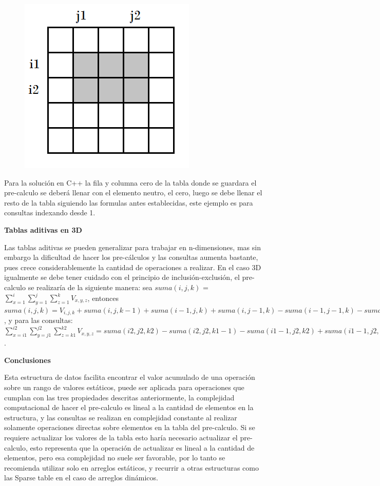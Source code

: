 \documentclass[12pt, a4paper]{article}
\newcommand\cppfile[2][]{

}
\newcommand{\subtitulo}[1]{\begin{center}\textbf{#1}\end{center}}
\begin{document}
\begin{figure}[!htb]
			\caption{}%
		\endminipage
			\centering
			\includegraphics[scale=0.4]{Estructuras_de_datos/imagenes/img4}
			\caption{}
		\endminipage
	\end{figure}
	
	Para la solución en C++ la fila y columna cero de la tabla donde se guardara el pre-calculo se deberá llenar
	con el elemento neutro, el cero, luego se debe llenar el resto de la tabla siguiendo las formulas antes 
	establecidas, este ejemplo es para consultas indexando desde 1.
	\cppfile[26-36]{Estructuras_de_datos/codigos/tablas_aditivas.cpp}
	
	\subtitulo{Tablas aditivas en 3D}
	
	Las tablas aditivas se pueden generalizar para trabajar en n-dimensiones, mas sin embargo la dificultad de hacer 
	los pre-cálculos y las consultas aumenta bastante, pues crece considerablemente la cantidad de operaciones a
	realizar. En el caso 3D igualmente se debe tener cuidado con el principio de inclusión-exclusión, el 
	pre-calculo se realizaría de la siguiente manera: sea 
	$suma(i,j,k)$ = $\sum_{x=1}^{i} \sum_{y=1}^{j} \sum_{z=1}^{k} V_{x,y,z}$, entonces  
	$suma(i,j,k) = V_{i,j,k} + suma(i,j,k-1)+suma(i-1,j,k)+suma(i,j-1,k)-suma(i-1,j-1,k)-suma(i-1,j,k-1)
	-suma(i,j-1,k-1)+suma(i-1,j-1,k-1)$, y para las consultas: $\sum_{x=i1}^{i2} \sum_{y=j1}^{j2} \sum_{z=k1}^{k2}
	V_{x,y,z} = suma(i2,j2,k2)-suma(i2,j2,k1-1)-suma(i1-1,j2,k2)+suma(i1-1,j2,k1-1)-suma(i2,j1-1,k2)
	+suma(i2,j1-1,k1-1)+suma(i1-1,j1-1,k2)-suma(i1-1,j1-1,k1-1)$.
	
	\subtitulo{Conclusiones}
	Esta estructura de datos facilita encontrar el valor acumulado de una operación sobre un rango de valores 
	estáticos, puede ser aplicada para operaciones que cumplan con las tres propiedades descritas
	anteriormente, la complejidad computacional de hacer el pre-calculo es lineal a la cantidad de
	elementos en la estructura, y las consultas se realizan en complejidad constante al realizar solamente operaciones
	directas sobre elementos en la tabla del pre-calculo. Si se requiere actualizar los valores de la tabla esto
	haría necesario actualizar el pre-calculo, esto representa que la operación de actualizar es lineal a la 
	cantidad de elementos, pero esa complejidad no suele ser favorable, por lo tanto se recomienda utilizar solo 
	en arreglos estáticos, y recurrir a otras estructuras como las Sparse table en el caso de arreglos dinámicos.
	
\end{document}
